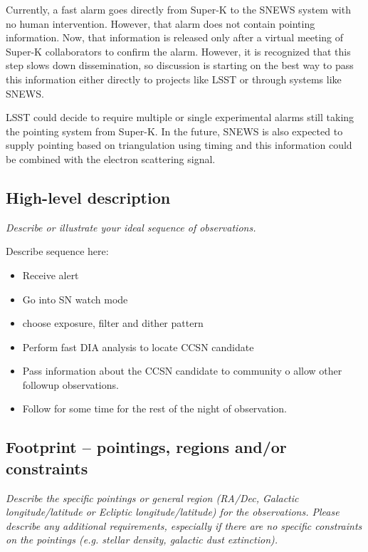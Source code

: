 \documentclass[11pt]{article}
\newcommand{\superk}  {Super\nobreakdash-K\xspace}
\begin{document}
Currently, a fast alarm goes directly from \superk to the SNEWS system
with no human intervention.  However, that alarm does not contain
pointing information.  Now, that information is released only after a
virtual meeting of \superk collaborators to confirm the alarm.
However, it is recognized that this step slows down dissemination, so
discussion is starting on the best way to pass this information either
directly to projects like LSST or through systems like SNEWS.

LSST could decide to require multiple or single experimental alarms
still taking the pointing system from \superk.  In the future, SNEWS
is also expected to supply pointing based on triangulation using
timing and this information could be combined with the electron
scattering signal.

\subsection{High-level description}
\begin{footnotesize}
{\it Describe or illustrate your ideal sequence of observations.}
\end{footnotesize}

\vspace{.3in}


Describe sequence here:

\begin{itemize}
\item Receive alert
\item Go into SN watch mode
\item choose exposure, filter and dither pattern
\item Perform fast DIA analysis to locate CCSN candidate
\item Pass information about the CCSN candidate to community o allow
  other followup observations.
\item Follow for some time for the rest of the night of observation.
\end{itemize}

\subsection{Footprint -- pointings, regions and/or constraints}
\begin{footnotesize}{\it Describe the specific pointings or general region (RA/Dec, Galactic longitude/latitude or 
Ecliptic longitude/latitude) for the observations. Please describe any additional requirements, especially if there
are no specific constraints on the pointings (e.g. stellar density, galactic dust extinction).}
\end{footnotesize}
\end{document}

